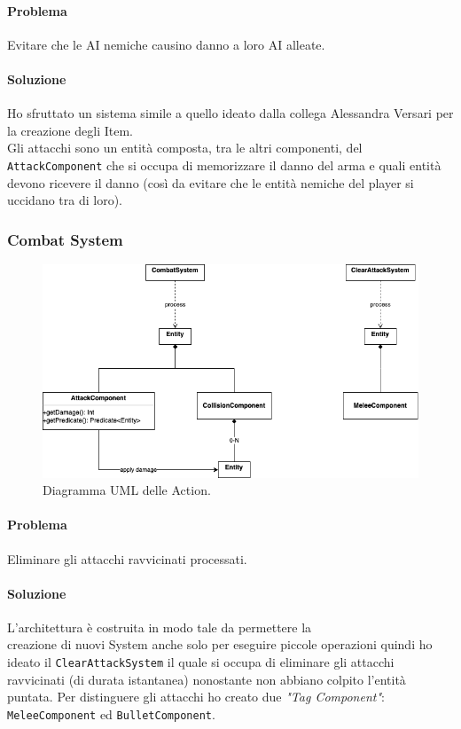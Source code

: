 \documentclass[a4paper,12pt]{report}
\begin{document}
\paragraph{Problema}
Evitare che le AI nemiche causino danno a loro AI alleate.
\paragraph{Soluzione}
Ho sfruttato un sistema simile a quello ideato dalla collega Alessandra Versari 
per la creazione degli Item.\\
Gli attacchi sono un entità composta, tra le altri componenti, del \texttt{AttackComponent} che 
si occupa di memorizzare il danno del arma e quali entità devono ricevere il 
danno (così da evitare che le entità nemiche del player si uccidano tra di loro).

\subsubsection{Combat System}

\begin{figure}[h]
	\centering
	\includegraphics[width=\textwidth]{uml/UML_CombatSystem.png}
	\caption{Diagramma UML delle Action.}
\end{figure}

\paragraph{Problema}
Eliminare gli attacchi ravvicinati processati.
\paragraph{Soluzione}
L'architettura è costruita in modo tale da permettere la \\
creazione di nuovi System anche solo per eseguire piccole operazioni quindi ho ideato il 
\texttt{ClearAttackSystem} il quale si occupa di eliminare gli attacchi
ravvicinati (di durata istantanea) nonostante non abbiano colpito l'entità puntata.
Per distinguere gli attacchi ho creato due \textit{"Tag Component"}: \texttt{MeleeComponent}
ed \texttt{BulletComponent}.
\end{document}
